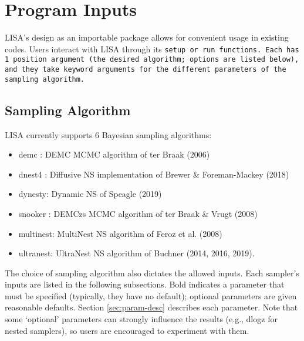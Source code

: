 \documentclass[letterpaper, 12pt]{article}
\begin{document}
\section{Program Inputs}
\label{sec:inputs}

LISA's design as an importable package allows for convenient usage in existing 
codes.  Users interact with LISA through its \tt{setup} or \tt{run} functions. 
Each has 1 position argument (the desired algorithm; options are listed below), 
and they take keyword arguments for the different parameters of the sampling 
algorithm.  

\subsection{Sampling Algorithm}

LISA currently supports 6 Bayesian sampling algorithms:
\begin{itemize}
\item demc   : DEMC MCMC algorithm of ter Braak (2006)
\item dnest4 : Diffusive NS implementation of Brewer & Foreman-Mackey (2018)
\item dynesty: Dynamic NS of Speagle (2019)
\item snooker  : DEMCzs MCMC algorithm of ter Braak \& Vrugt (2008)
\item multinest: MultiNest NS algorithm of Feroz et al. (2008)
\item ultranest: UltraNest NS algorithm of Buchner (2014, 2016, 2019).
\end{itemize}

\noindent The choice of sampling algorithm also dictates the allowed inputs.  
Each sampler's inputs are listed in the following subsections.  Bold 
indicates a parameter that must be specified (typically, they have no default); 
optional parameters are given reasonable defaults.  Section 
\ref{sec:param-desc} describes each parameter.  Note that some `optional' 
parameters can strongly influence the results (e.g., dlogz for nested samplers),
so users are encouraged to experiment with them.
\end{document}
